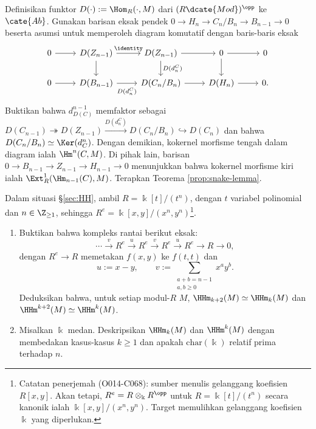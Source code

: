 \begin{Exercises}
	\begin{hint}
		Definisikan funktor
		$D(\cdot):=\Hom_R(\cdot,M)$ dari $(R\dcate{Mod})^{\opp}$ ke
		$\cate{Ab}$. Gunakan barisan eksak pendek
		$0\to H_n\to C_n/B_n\to B_{n-1}\to0$ beserta asumsi untuk memperoleh
		diagram komutatif dengan baris-baris eksak
		\[
		\begin{tikzcd}
			0 \arrow[r] &
			D(Z_{n-1}) \arrow[r, "\identity"] \arrow[d] &
			D(Z_{n-1}) \arrow[r] \arrow[d, "{D(d^C_n)}"] &
			0 \arrow[r] \arrow[d] & 0 \\
			0 \arrow[r] &
			D(B_{n-1}) \arrow[r, "{D(d^C_n)}"' inner sep=0.5em] &
			D(C_n/B_n) \arrow[r] &
			D(H_n) \arrow[r] & 0 .
		\end{tikzcd}
		\]
		Buktikan bahwa $d_{D(C)}^{n-1}$ memfaktor sebagai
		$D(C_{n-1})\twoheadrightarrow D(Z_{n-1})
		\xrightarrow{D(d^C_n)}D(C_n/B_n)\hookrightarrow D(C_n)$ dan bahwa
		$D(C_n/B_n)\simeq\Ker(d_C^n)$. Dengan demikian, kokernel morfisme
		tengah dalam diagram ialah $\Hm^n(C,M)$. Di pihak lain, barisan
		$0\to B_{n-1}\to Z_{n-1}\to H_{n-1}\to0$ menunjukkan bahwa kokernel
		morfisme kiri ialah $\Ext_R^1(\Hm_{n-1}(C),M)$. Terapkan Teorema
		\ref{prop:snake-lemma}.
	\end{hint}

	\item Dalam situasi \S\ref{sec:HH}, ambil
	$R=\Bbbk[t]/(t^n)$, dengan $t$ variabel polinomial dan
	$n\in\Z_{\geq1}$, sehingga
	$R^e=\Bbbk[x,y]/(x^n,y^n)$\footnote{Catatan penerjemah (O014-C068):
	sumber menulis gelanggang koefisien $R[x,y]$. Akan tetapi,
	$R^e=R\otimes_{\Bbbk}R^{\opp}$ untuk
	$R=\Bbbk[t]/(t^n)$ secara kanonik ialah
	$\Bbbk[x,y]/(x^n,y^n)$. Target memulihkan gelanggang koefisien
	$\Bbbk$ yang diperlukan.}.
	\begin{enumerate}
		\item Buktikan bahwa kompleks rantai berikut eksak:
		\[
			\cdots\xrightarrow{v}R^e\xrightarrow{u}R^e
			\xrightarrow{v}R^e\xrightarrow{u}R^e\to R\to0,
		\]
		dengan $R^e\to R$ memetakan $f(x,y)$ ke $f(t,t)$ dan
		\[
			u:=x-y,\qquad
			v:=\sum_{\substack{a+b=n-1\\a,b\geq0}}x^ay^b.
		\]
		Deduksikan bahwa, untuk setiap modul-$R$ $M$,
		$\HHm_{k+2}(M)\simeq\HHm_k(M)$ dan
		$\HHm^{k+2}(M)\simeq\HHm^k(M)$.
		\item Misalkan $\Bbbk$ medan. Deskripsikan $\HHm_k(M)$ dan
		$\HHm^k(M)$ dengan membedakan kasus-kasus $k\geq1$ dan apakah
		$\mathrm{char}(\Bbbk)$ relatif prima terhadap $n$.
	\end{enumerate}


\end{Exercises}
